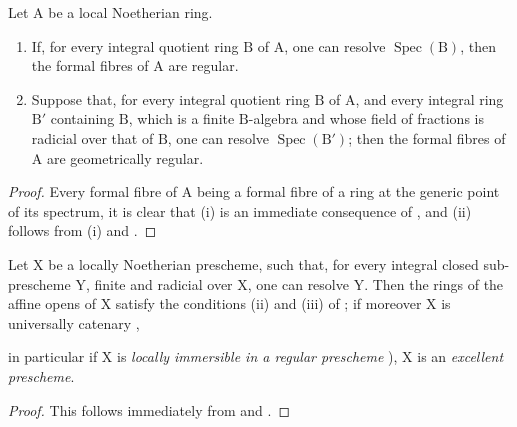 \begin{corollary}[7.9.4]
\label{IV.7.9.4}
Let $\mathrm{A}$ be a local Noetherian ring.
\begin{enumerate}[label=(\roman*)]
  \item If, for every integral quotient ring $\mathrm{B}$ of $\mathrm{A}$, one can resolve $\operatorname{Spec}(\mathrm{B})$, then the formal fibres of $\mathrm{A}$ are regular.
  \item Suppose that, for every integral quotient ring $\mathrm{B}$ of $\mathrm{A}$, and every integral ring $\mathrm{B}'$ containing $\mathrm{B}$, which is a finite $\mathrm{B}$-algebra and whose field of fractions is radicial over that of $\mathrm{B}$, one can resolve $\operatorname{Spec}(\mathrm{B}')$; then the formal fibres of $\mathrm{A}$ are geometrically regular.
\end{enumerate}
\end{corollary}

\begin{proof}
Every formal fibre of $\mathrm{A}$ being a formal fibre of a ring at the generic point of its spectrum, it is clear that (i) is an immediate consequence of , and (ii) follows from (i) and .
\end{proof}

\begin{proposition}[7.9.5]
\label{IV.7.9.5}
Let $\mathrm{X}$ be a locally Noetherian prescheme, such that, for every integral closed sub-prescheme $\mathrm{Y}$, finite and radicial over $\mathrm{X}$, one can resolve $\mathrm{Y}$. Then the rings of the affine opens of $\mathrm{X}$ satisfy the conditions (ii) and (iii) of ; if moreover $\mathrm{X}$ is universally catenary ,


in particular if $\mathrm{X}$ is \emph{locally immersible in a regular prescheme} ), $\mathrm{X}$ is an \emph{excellent prescheme}.
\end{proposition}

\begin{proof}
This follows immediately from  and .
\end{proof}

